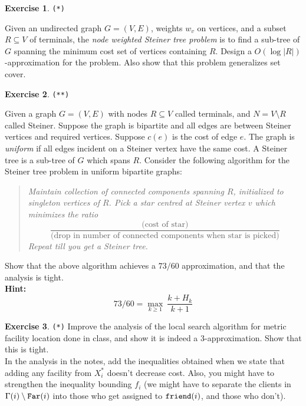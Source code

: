 \documentclass[11pt]{article}
\theoremstyle{definition}
\newtheorem{exercise}{Exercise}
\begin{document}
\begin{exercise} {{\tt (*)}}

Given an undirected graph $G=(V,E)$, weights $w_v$ on vertices, and a subset $R\subseteq V$ of terminals, 
the {\em node weighted Steiner tree problem} is to find a sub-tree of $G$ spanning the minimum cost set of vertices containing $R$. Design a $O(\log |R|)$-approximation for the problem. Also show that this problem generalizes set cover.
\end{exercise}
\vspace{1ex}


\begin{exercise} {{\tt (**)}}

Given a graph $G=(V,E)$ with nodes $R\subseteq V$ called terminals, and $N= V\setminus R$ called Steiner.
Suppose the graph is bipartite and all edges are between Steiner vertices and required vertices. 
Suppose $c(e)$ is the cost of edge $e$. The graph is {\em uniform} if all edges incident on a Steiner vertex have the same cost. A Steiner tree is a sub-tree of $G$ which spans $R$. Consider the following algorithm for the Steiner tree problem in uniform bipartite graphs:

\begin{quote}{\em 
Maintain collection of connected components spanning $R$, initialized to singleton vertices of $R$.
Pick a star centred at Steiner vertex $v$ which minimizes the ratio 
$$\frac{\mbox{(cost of star)}}{\textrm{(drop in number of connected components when star is picked)}}$$ Repeat till you get a Steiner tree. 
}
\end{quote}
Show that the above algorithm achieves a $73/60$ approximation, and that the analysis is tight. \\

\noindent
{\bf Hint:} $$73/60 =\max_{k\ge 1}~ \frac{k+H_k}{k+1}$$

\end{exercise}
\vspace{1ex}
\begin{exercise}{{\tt (*)}}
Improve the analysis of the local search algorithm for metric facility location
done in class, and show it is indeed a $3$-approximation.
Show that this is tight. 
\\  In the analysis in the notes, add the inequalities obtained when we state that adding any facility from $X^*_i$ doesn't decrease cost. Also, you might have to strengthen the inequality bounding $f_i$ (we might have to separate the clients in $\Gamma(i)\setminus {\tt Far}(i)$ into those who get
assigned to ${\tt friend}(i)$, and those who don't).
\end{exercise}
\end{document}
